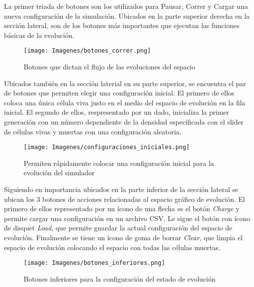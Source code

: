 \documentclass[]{article}
\begin{document}
				\hfill \break
				\justifying
				La primer triada de botones son los utilizados para Pausar, Correr y Cargar una nueva configuración de la simulación. Ubicados en la parte superior derecha en la sección lateral, son de los botones más importantes que ejecutan las funciones básicas de la evolución.
				
				\begin{figure}[!h]
					\centering
					\texttt{[image: Imagenes/botones\_correr.png]}
					\caption{Botones que dictan el flujo de las evoluciones del espacio}
					\label{Evolution_buttons}
				\end{figure}
				
				\hfill\break
				\justifying
				Ubicados también en la sección laterial en su parte superior, se encuentra el par de botones que permiten elegir una configuración inicial. El primero de ellos coloca una única célula viva justo en el medio del espacio de evolución en la fila inicial.
				El segundo de ellos, respresentado por un dado, inicializa la primer generación con un número dependiente de la densidad específicada con el slider de células vivas y muertas con una configuración aleatoria.
				
				\begin{figure}[!h]
					\centering
					\texttt{[image: Imagenes/configuraciones\_iniciales.png]}
					\caption{Permiten rápidamente colocar una configuración inicial para la evolución del simulador}
					\label{Config_buttons}
				\end{figure}
				
				
				\hfill \break
				\justifying
				Siguiendo en importancia ubicados en la parte inferior de la sección lateral se ubican los 3 botones de acciones relacionadas al espacio gráfico de evolución. El primero de ellos representado por un ícono de una flecha es el botón \textit{Charge} y permite cargar una configuración en un archivo CSV. Le sigue el botón con ícono de disquet \textit{Load}, que permite guardar la actual configuración del espacio de evolución. Finalmente se tiene un ícono de goma de borrar \textit{Clear}, que limpia el espacio de evolución colocando el espacio con todas las células muertas.
				
				\begin{figure}[!h]
					\centering
					\texttt{[image: Imagenes/botones\_inferiores.png]}
					\caption{Botones inferiores para la configuración del estado de evolución}
					\label{Space_configuration_buttons}
				\end{figure}
				
\end{document}
